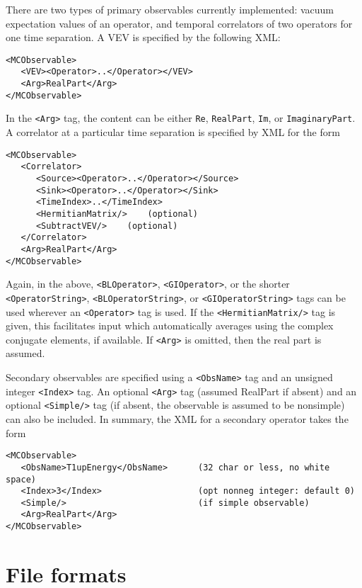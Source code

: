 \documentclass[12pt]{article}
\newcommand{\vb}{\texttt}
\begin{document}
There are two types of primary observables currently implemented: vacuum
expectation values of an operator, and temporal correlators of two
operators for one time separation.  A VEV is specified by the following XML: 
\begin{verbatim}
<MCObservable>
   <VEV><Operator>..</Operator></VEV>
   <Arg>RealPart</Arg>
</MCObservable>
\end{verbatim}
In the \vb{<Arg>} tag, the content can be either \vb{Re},
\vb{RealPart}, \vb{Im}, or \vb{ImaginaryPart}.
A correlator at a particular time separation is specified by XML for the form
\begin{verbatim}
<MCObservable>
   <Correlator>
      <Source><Operator>..</Operator></Source>
      <Sink><Operator>..</Operator></Sink>
      <TimeIndex>..</TimeIndex>
      <HermitianMatrix/>    (optional)
      <SubtractVEV/>    (optional)
   </Correlator>
   <Arg>RealPart</Arg>
</MCObservable>
\end{verbatim}
Again, in the above,  \vb{<BLOperator>}, \vb{<GIOperator>}, or the shorter
\vb{<OperatorString>}, \vb{<BLOperatorString>}, or
\vb{<GIOperatorString>} tags can be used wherever an \vb{<Operator>}
tag is used. If the \vb{<HermitianMatrix/>} tag is given, this facilitates
input which automatically averages using the complex
conjugate elements, if available.  If \vb{<Arg>} is omitted, then
the real part is assumed.

Secondary observables are specified using a \vb{<ObsName>} tag and
an unsigned integer \vb{<Index>} tag.  An optional \vb{<Arg>} tag
(assumed RealPart if absent) and an optional \vb{<Simple/>}
tag (if absent, the observable is assumed to be nonsimple) can also
be included.   In summary, the XML for a secondary operator takes the form
\begin{verbatim}
<MCObservable>
   <ObsName>T1upEnergy</ObsName>      (32 char or less, no white space)
   <Index>3</Index>                   (opt nonneg integer: default 0)
   <Simple/>                          (if simple observable)
   <Arg>RealPart</Arg>
</MCObservable>
\end{verbatim}

\section{File formats}
\end{document}
